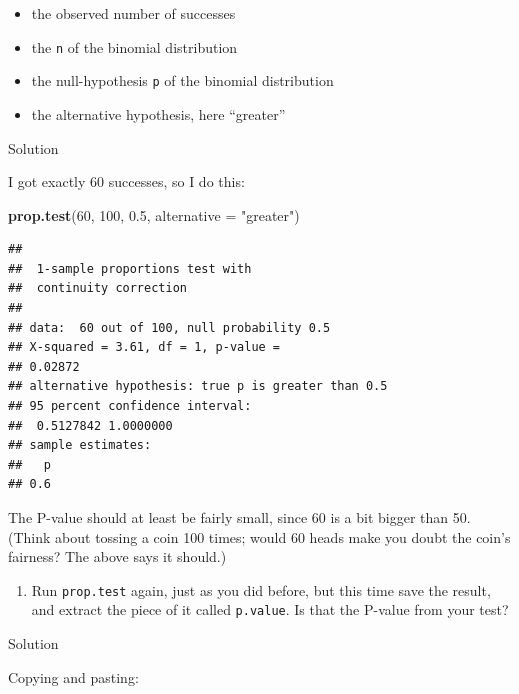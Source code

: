 \documentclass[]{tufte-book}
\newenvironment{Shaded}{}{}
\newcommand{\DataTypeTok}[1]{\textcolor[rgb]{0.56,0.13,0.00}{#1}}
\newcommand{\DecValTok}[1]{\textcolor[rgb]{0.25,0.63,0.44}{#1}}
\newcommand{\FloatTok}[1]{\textcolor[rgb]{0.25,0.63,0.44}{#1}}
\newcommand{\KeywordTok}[1]{\textcolor[rgb]{0.00,0.44,0.13}{\textbf{#1}}}
\newcommand{\NormalTok}[1]{#1}
\newcommand{\OperatorTok}[1]{\textcolor[rgb]{0.40,0.40,0.40}{#1}}
\newcommand{\StringTok}[1]{\textcolor[rgb]{0.25,0.44,0.63}{#1}}
\providecommand{\tightlist}{%
  \setlength{\itemsep}{0pt}\setlength{\parskip}{0pt}}
\theoremstyle{definition}
\theoremstyle{definition}
\theoremstyle{definition}
\theoremstyle{remark}
\begin{document}
\begin{itemize}
\item
  the observed number of successes
\item
  the \texttt{n} of the binomial distribution
\item
  the null-hypothesis \texttt{p} of the binomial distribution
\item
  the alternative hypothesis, here ``greater''
\end{itemize}

Solution

I got exactly 60 successes, so I do this:

\begin{Shaded}
\begin{Highlighting}[]
\KeywordTok{prop.test}\NormalTok{(}\DecValTok{60}\NormalTok{, }\DecValTok{100}\NormalTok{, }\FloatTok{0.5}\NormalTok{, }\DataTypeTok{alternative =} \StringTok{"greater"}\NormalTok{)}
\end{Highlighting}
\end{Shaded}

\begin{verbatim}
## 
##  1-sample proportions test with
##  continuity correction
## 
## data:  60 out of 100, null probability 0.5
## X-squared = 3.61, df = 1, p-value =
## 0.02872
## alternative hypothesis: true p is greater than 0.5
## 95 percent confidence interval:
##  0.5127842 1.0000000
## sample estimates:
##   p 
## 0.6
\end{verbatim}

The P-value should at least be fairly small, since 60 is a bit bigger
than 50. (Think about tossing a coin 100 times; would 60 heads make you
doubt the coin's fairness? The above says it should.)

\begin{enumerate}
\def\labelenumi{(\alph{enumi})}
\setcounter{enumi}{2}
\tightlist
\item
  Run \texttt{prop.test} again, just as you did before, but this time
  save the result, and extract the piece of it called \texttt{p.value}.
  Is that the P-value from your test?
\end{enumerate}

Solution

Copying and pasting:

\begin{Shaded}
\end{Shaded}
\end{document}
